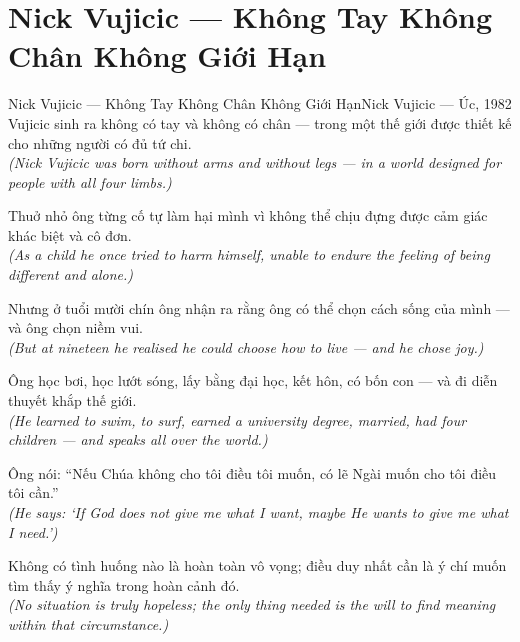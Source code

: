 \section{Nick Vujicic --- Không Tay Không Chân Không Giới Hạn}
\begin{truyen}{Nick Vujicic --- Không Tay Không Chân Không Giới Hạn}{Nick Vujicic --- Úc, 1982}
 Vujicic sinh ra không có tay và không có chân --- trong một thế giới được thiết kế cho những người có đủ tứ chi.\\[4pt]
\textit{(Nick Vujicic was born without arms and without legs --- in a world designed for people with all four limbs.)}

Thuở nhỏ ông từng cố tự làm hại mình vì không thể chịu đựng được cảm giác khác biệt và cô đơn.\\[4pt]
\textit{(As a child he once tried to harm himself, unable to endure the feeling of being different and alone.)}

Nhưng ở tuổi mười chín ông nhận ra rằng ông có thể chọn cách sống của mình --- và ông chọn niềm vui.\\[4pt]
\textit{(But at nineteen he realised he could choose how to live --- and he chose joy.)}

Ông học bơi, học lướt sóng, lấy bằng đại học, kết hôn, có bốn con --- và đi diễn thuyết khắp thế giới.\\[4pt]
\textit{(He learned to swim, to surf, earned a university degree, married, had four children --- and speaks all over the world.)}

Ông nói: ``Nếu Chúa không cho tôi điều tôi muốn, có lẽ Ngài muốn cho tôi điều tôi cần.''\\[4pt]
\textit{(He says: `If God does not give me what I want, maybe He wants to give me what I need.')}

\end{truyen}
\begin{baihoc}
  Không có tình huống nào là hoàn toàn vô vọng; điều duy nhất cần là ý chí muốn tìm thấy ý nghĩa trong hoàn cảnh đó.\\[4pt]
  \textit{(No situation is truly hopeless; the only thing needed is the will to find meaning within that circumstance.)}
\end{baihoc}

